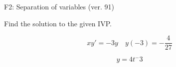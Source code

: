 \begin{exercise}
  \begin{exerciseTitle}F2: Separation of variables (ver. 91)\end{exerciseTitle}
  \begin{exerciseStatement}
    
Find the solution to the given IVP.

    
\[xy'= -3 y \hspace{1em} y( -3 ) = -\frac{4}{27}\]

  \end{exerciseStatement}
  \begin{exerciseAnswer}
    
\[y= 4 t^ -3\]

  \end{exerciseAnswer}
\end{exercise}